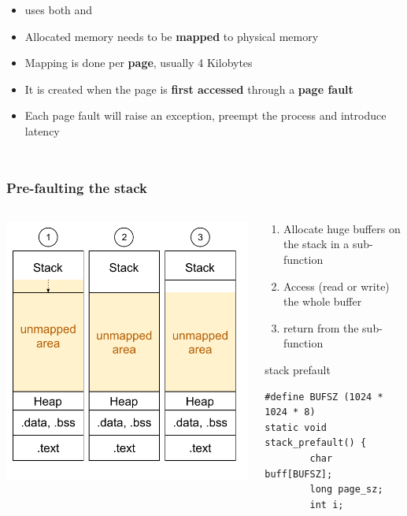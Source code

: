 \begin{frame}
\begin{columns}
\begin{itemize}
				\item {} uses both  and 
				\item Allocated memory needs to be \textbf{mapped} to physical memory
				\item Mapping is done per \textbf{page}, usually 4 Kilobytes
				\item It is created when the page is \textbf{first accessed} through a \textbf{page fault}
				\item Each page fault will raise an exception, preempt the process and introduce latency
			\end{itemize}
	\end{columns}
\end{frame}

\begin{frame}[fragile]
	\frametitle{Pre-faulting the stack}
	\begin{columns}
		\begin{column}{0.35\textwidth}
    \includegraphics[width=\textwidth]{slides/realtime-linux-application-development/prefault_stack.pdf}
		\end{column}
		\begin{column}{0.65\textwidth}
			\begin{enumerate}
				\item Allocate huge buffers on the stack in a sub-function
				\item Access (read or write) the whole buffer
				\item return from the sub-function
			\end{enumerate}
			\begin{block}{stack prefault}
			\fontsize{8}{7}\selectfont
				\begin{verbatim}
#define BUFSZ (1024 * 1024 * 8)
static void stack_prefault() {
        char buff[BUFSZ];
        long page_sz;
        int i;


\end{verbatim}
\end{block}
\end{column}
\end{columns}
\end{frame}
